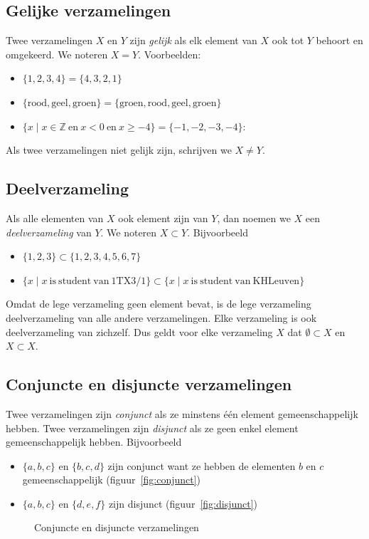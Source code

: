 \subsection{Gelijke verzamelingen}
Twee verzamelingen $X$ en $Y$ zijn \emph{gelijk} als elk element van $X$ ook tot $Y$ behoort en omgekeerd. We noteren $X=Y$. Voorbeelden:
\begin{itemize}
\item $\{1,2,3,4 \}=\{4,3,2,1 \}$
\item $\{\mathrm{rood, geel, groen} \}=\{\mathrm{groen, rood, geel, groen} \}$
\item $\{x\mid x \in \mathbb{Z} ~\mathrm{ en }~ x<0 ~\mathrm{ en }~ x\geqslant -4\}=\{-1,-2,-3,-4 \}$:
\end{itemize}
Als twee verzamelingen niet gelijk zijn, schrijven we $X \not = Y$.

\subsection{Deelverzameling}
Als alle elementen van $X$ ook element zijn van $Y$, dan noemen we $X$ een \emph{deelverzameling} van $Y$. We noteren $X\subset Y$. Bijvoorbeeld
\begin{itemize}
\item $\{1,2,3 \}\subset \{ 1,2,3,4,5,6,7 \}$
\item $\{x \mid x ~\mathrm{is~student~van~1TX3/1} \} \subset \{x \mid x ~\mathrm{is~student~van~KHLeuven} \}$
\end{itemize}

Omdat de lege verzameling geen element bevat, is de lege verzameling  deelverzameling van alle andere verzamelingen. Elke verzameling is ook deelverzameling van zichzelf. Dus geldt voor elke verzameling $X$ dat $\emptyset \subset X$ en $X \subset X$.

\subsection{Conjuncte en disjuncte verzamelingen}
Twee verzamelingen zijn \emph{conjunct} als ze minstens \'e\'en element gemeenschappelijk hebben.  Twee verzamelingen zijn \emph{disjunct} als ze geen enkel element gemeenschappelijk hebben. Bijvoorbeeld
\begin{itemize}
\item $\{ a, b, c \}$ en $\{ b, c, d \}$ zijn conjunct want ze hebben de elementen $b$ en $c$ gemeenschappelijk (figuur~\ref{fig:conjunct}) 
\item  $\{ a, b, c \}$ en $\{ d, e, f \}$ zijn disjunct (figuur~\ref{fig:disjunct})
\end{itemize}
\begin{figure}
\centering
{}\qquad
{}
\caption{Conjuncte en disjuncte verzamelingen}
\label{fig:conjunct-disjunct}
\end{figure}

